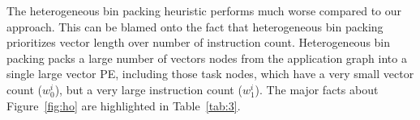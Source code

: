 The heterogeneous bin packing heuristic performs much worse compared to
our approach. This can be blamed onto the fact that heterogeneous bin
packing prioritizes vector length over number of instruction
count. Heterogeneous bin packing packs a large number of vectors nodes
from the application graph into a single large vector PE, including
those task nodes, which have a very small vector count ($w^i_0$), but a
very large instruction count ($w^i_1$). The major facts about
Figure~\ref{fig:ho} are highlighted in Table~\ref{tab:3}.

\begin{figure}[t!]
\end{figure}
